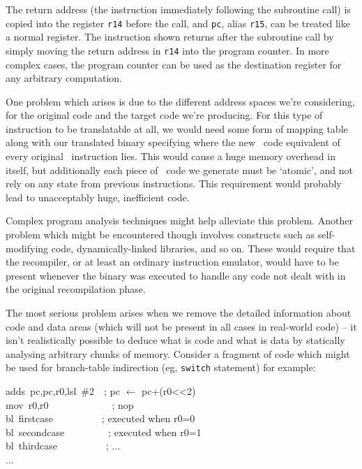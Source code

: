The return address (the instruction immediately following the subroutine call) is copied into the register {\tt r14} before the call, and {\tt pc}, alias {\tt r15}, can be treated like a normal register. The instruction shown returns after the subroutine call by simply moving the return address in {\tt r14} into the program counter. In more complex cases, the program counter can be used as the destination register for any arbitrary computation.

One problem which arises is due to the different address spaces we're considering, for the original code and the target code we're producing. For this type of instruction to be translatable at all, we would need some form of mapping table along with our translated binary specifying where the new \ia\ code equivalent of every original \arm\ instruction lies. This would cause a huge memory overhead in itself, but additionally each piece of \ia\ code we generate must be `atomic', and not rely on any state from previous instructions. This requirement would probably lead to unacceptably huge, inefficient code.

Complex program analysis techniques might help alleviate this problem. Another problem which might be encountered though involves constructs such as self-modifying code, dynamically-linked libraries, and so on. These would require that the recompiler, or at least an ordinary instruction emulator, would have to be present whenever the binary was executed to handle any code not dealt with in the original recompilation phase.

The most serious problem arises when we remove the detailed information about code and data areas (which will not be present in all cases in real-world code) -- it isn't realistically possible to deduce what is code and what is data by statically analysing arbitrary chunks of memory. Consider a fragment of code which might be used for branch-table indirection (eg, {\tt switch} statement) for example:

\begin{code}
adds~pc,pc,r0,lsl~\#2~~; pc $\leftarrow$ pc+(r0<<2)\\
mov~r0,r0~~~~~~~~~~~~~; nop\\
bl~firstcase~~~~~~~~~~; executed when r0=0\\
bl~secondcase~~~~~~~~~; executed when r0=1\\
bl~thirdcase~~~~~~~~~~; ...\\
...
\end{code}

